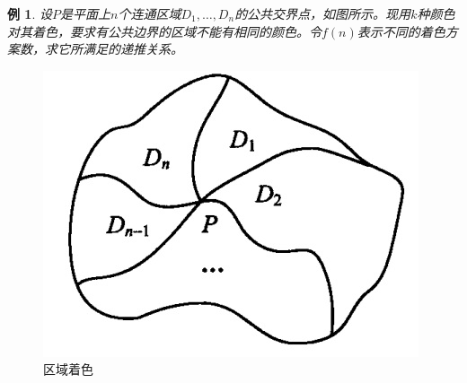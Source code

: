 \documentclass[punct]{ctexbeamer}
\newtheorem{ex}{例}[section]
\def\sol{\noindent {\bf 解\ }}
\begin{document}
%
\begin{frame}
	\begin{ex}
		设$P$是平面上$n$个连通区域$D_{1},\dots,D_{n}$的公共交界点，如图所示。现用$k$种颜色对其着色，要求有公共边界的区域不能有相同的颜色。令$f(n)$表示不同的着色方案数，求它所满足的递推关系。
	\end{ex}
\begin{figure}[h]
	\centering
	\includegraphics[width=0.5\linewidth]{zone coloring.jpg}
	\caption{ 区域着色}
\end{figure}
\end{frame}
\end{document}
